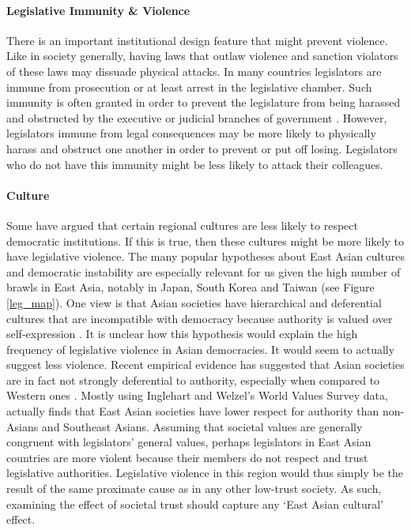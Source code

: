 \documentclass[a4paper]{article}\usepackage{graphicx, color}
\begin{document}
\paragraph{Legislative Immunity \& Violence}

There is an important institutional design feature that might prevent violence. Like in society generally, having laws that outlaw violence and sanction violators of these laws may dissuade physical attacks. In many countries legislators are immune from prosecution or at least arrest in the legislative chamber. Such immunity is often granted in order to prevent the legislature from being harassed and obstructed by the executive or judicial branches of government  \citep{Seghetti1984}. However, legislators immune from legal consequences may be more likely to physically harass and obstruct one another in order to prevent or put off losing. Legislators who do not have this immunity might be less likely to attack their colleagues. 

\paragraph{Culture}

Some have argued that certain regional cultures are less likely to respect democratic institutions. If this is true, then these cultures might be more likely to have legislative violence. The many popular hypotheses about East Asian cultures and democratic instability are especially relevant for us given the high number of brawls in East Asia, notably in Japan, South Korea and Taiwan (see Figure \ref{leg_map}). One view is that Asian societies have hierarchical and deferential cultures that are incompatible with democracy because authority is valued over self-expression \citep[see][212-213 for a discussion]{Dalton2005}. It is unclear how this hypothesis would explain the high frequency of legislative violence in Asian democracies. It would seem to actually suggest less violence. Recent empirical evidence has suggested that Asian societies are in fact not strongly deferential to authority, especially when compared to Western ones \citep{Dalton2005, KimAsianValues2010}. Mostly using Inglehart and Welzel's World Values Survey data, \cite{KimAsianValues2010} actually finds that East Asian societies have lower respect for authority than non-Asians and Southeast Asians. Assuming that societal values are generally congruent with legislators' general values, perhaps legislators in East Asian countries are more violent because their members do not respect and trust legislative authorities. Legislative violence in this region would thus simply be the result of the same proximate cause as in any other low-trust society. As such, examining the effect of societal trust should capture any `East Asian cultural' effect. 
\end{document}
